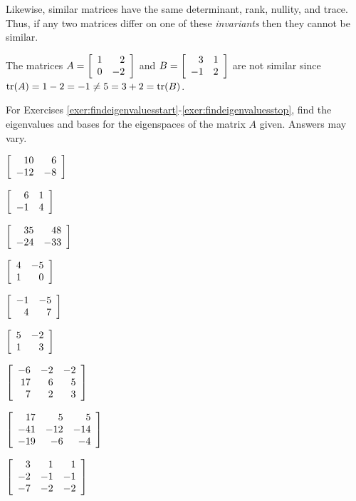 Likewise, similar matrices have the same determinant, rank, nullity, and trace. Thus, if any two matrices differ on one of these \emph{invariants} then they cannot be similar.\\

\begin{Exam} The matrices $A=\mtx{rr}{1 & 2\\ 0  & -2}$ and $B = \mtx{rr}{3&1\\-1&2}$ are not similar since $\tr(A) = 1-2 = -1\neq 5 = 3+2 = \tr(B)$.
\end{Exam}\vs


\noindent For Exercises \ref{exer:findeigenvaluesstart}-\ref{exer:findeigenvaluesstop}, find the eigenvalues and bases for the eigenspaces of the matrix $A$ given. Answers may vary.
\begin{enumerate}[!HW!, start=1, label=$\spadesuit$ \arabic*., ref=\arabic*]
\begin{multicols}{3}
\item\label{exer:findeigenvaluesstart} $\mtx{rr}{10&6\\-12&-8}$ %
\item $\mtx{rr}{6&1\\-1&4}$ %
\item $\mtx{rr}{35&48\\-24&-33}$ %
\end{multicols}
\begin{multicols}{3}
\item $\mtx{rr}{4&-5\\1&0}$ %
\item $\mtx{rr}{-1&-5\\4&7}$ %
\item $\mtx{rr}{5&-2\\1&3}$ %
\end{multicols}
\begin{multicols}{3}
\item $\mtx{rrr}{-6  & -2 & -2 \\ 17 & 6 & 5 \\ 7 & 2 & 3}$
\item $\mtx{rrr}{17&5&5\\-41&-12&-14\\-19&-6&-4}$
\item\label{exer:findeigenvaluesstop} $\mtx{rrr}{3&1&1\\-2&-1&-1\\-7&-2&-2}$
\end{multicols}
\end{enumerate}

